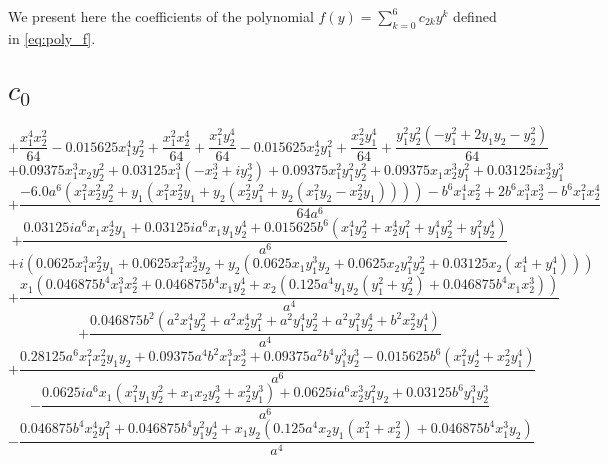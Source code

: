 We present here the coefficients of the polynomial $f(y) = \sum_{k=0}^{6} c_{2k} y^k$ defined in \autoref{eq:poly_f}.

\section{$c_0$}

$$+\frac{x_{1}^{4} x_{2}^{2}}{64} - 0.015625 x_{1}^{4} y_{2}^{2} + \frac{x_{1}^{2} x_{2}^{4}}{64} + \frac{x_{1}^{2} y_{2}^{4}}{64} - 0.015625 x_{2}^{4} y_{1}^{2} + \frac{x_{2}^{2} y_{1}^{4}}{64} + \frac{y_{1}^{2} y_{2}^{2} \left(- y_{1}^{2} + 2 y_{1} y_{2} - y_{2}^{2}\right)}{64}$$
$$+0.09375 x_{1}^{3} x_{2} y_{2}^{2} + 0.03125 x_{1}^{3} \left(- x_{2}^{3} + i y_{2}^{3}\right) + 0.09375 x_{1}^{2} y_{1}^{2} y_{2}^{2} + 0.09375 x_{1} x_{2}^{3} y_{1}^{2} + 0.03125 i x_{2}^{3} y_{1}^{3}$$
$$+\frac{- 6.0 a^{6} \left(x_{1}^{2} x_{2}^{2} y_{2}^{2} + y_{1} \left(x_{1}^{2} x_{2}^{2} y_{1} + y_{2} \left(x_{2}^{2} y_{1}^{2} + y_{2} \left(x_{1}^{2} y_{2} - x_{2}^{2} y_{1}\right)\right)\right)\right) - b^{6} x_{1}^{4} x_{2}^{2} + 2 b^{6} x_{1}^{3} x_{2}^{3} - b^{6} x_{1}^{2} x_{2}^{4}}{64 a^{6}}$$
$$+\frac{0.03125 i a^{6} x_{1} x_{2}^{4} y_{1} + 0.03125 i a^{6} x_{1} y_{1} y_{2}^{4} + 0.015625 b^{6} \left(x_{1}^{4} y_{2}^{2} + x_{2}^{4} y_{1}^{2} + y_{1}^{4} y_{2}^{2} + y_{1}^{2} y_{2}^{4}\right)}{a^{6}}$$
$$+i \left(0.0625 x_{1}^{3} x_{2}^{2} y_{1} + 0.0625 x_{1}^{2} x_{2}^{3} y_{2} + y_{2} \left(0.0625 x_{1} y_{1}^{3} y_{2} + 0.0625 x_{2} y_{1}^{2} y_{2}^{2} + 0.03125 x_{2} \left(x_{1}^{4} + y_{1}^{4}\right)\right)\right)$$
$$+\frac{x_{1} \left(0.046875 b^{4} x_{1}^{3} x_{2}^{2} + 0.046875 b^{4} x_{1} y_{2}^{4} + x_{2} \left(0.125 a^{4} y_{1} y_{2} \left(y_{1}^{2} + y_{2}^{2}\right) + 0.046875 b^{4} x_{1} x_{2}^{3}\right)\right)}{a^{4}}$$
$$+\frac{0.046875 b^{2} \left(a^{2} x_{1}^{4} y_{2}^{2} + a^{2} x_{2}^{4} y_{1}^{2} + a^{2} y_{1}^{4} y_{2}^{2} + a^{2} y_{1}^{2} y_{2}^{4} + b^{2} x_{2}^{2} y_{1}^{4}\right)}{a^{4}}$$
$$+\frac{0.28125 a^{6} x_{1}^{2} x_{2}^{2} y_{1} y_{2} + 0.09375 a^{4} b^{2} x_{1}^{3} x_{2}^{3} + 0.09375 a^{2} b^{4} y_{1}^{3} y_{2}^{3} - 0.015625 b^{6} \left(x_{1}^{2} y_{2}^{4} + x_{2}^{2} y_{1}^{4}\right)}{a^{6}}$$
$$- \frac{0.0625 i a^{6} x_{1} \left(x_{1}^{2} y_{1} y_{2}^{2} + x_{1} x_{2} y_{2}^{3} + x_{2}^{2} y_{1}^{3}\right) + 0.0625 i a^{6} x_{2}^{3} y_{1}^{2} y_{2} + 0.03125 b^{6} y_{1}^{3} y_{2}^{3}}{a^{6}}$$
$$- \frac{0.046875 b^{4} x_{2}^{4} y_{1}^{2} + 0.046875 b^{4} y_{1}^{2} y_{2}^{4} + x_{1} y_{2} \left(0.125 a^{4} x_{2} y_{1} \left(x_{1}^{2} + x_{2}^{2}\right) + 0.046875 b^{4} x_{1}^{3} y_{2}\right)}{a^{4}}$$
